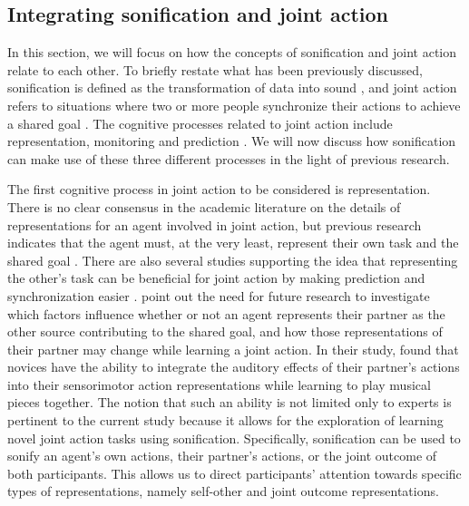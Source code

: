 \documentclass[10pt,a4paper,onecolumn]{article}
\begin{document}
\hypertarget{integrating-sonification-and-joint-action}{%
\subsection{Integrating sonification and joint action}\label{integrating-sonification-and-joint-action}}

In this section, we will focus on how the concepts of sonification and joint action relate to each other. To briefly restate what has been previously discussed, sonification is defined as the transformation of data into sound \autocite{kramerSonificationReportStatus1999}, and joint action refers to situations where two or more people synchronize their actions to achieve a shared goal \autocite{knoblichPsychologicalResearchJoint2011}. The cognitive processes related to joint action include representation, monitoring and prediction \autocite{loehrMonitoringIndividualJoint2013,sebanzJointActionBodies2006,vesperMinimalArchitectureJoint2010}. We will now discuss how sonification can make use of these three different processes in the light of previous research.

The first cognitive process in joint action to be considered is representation. There is no clear consensus in the academic literature on the details of representations for an agent involved in joint action, but previous research indicates that the agent must, at the very least, represent their own task and the shared goal \autocite{vesperMinimalArchitectureJoint2010}. There are also several studies supporting the idea that representing the other's task can be beneficial for joint action by making prediction and synchronization easier \autocite{boltSensoryAttenuationAuditory2021,kellerPianistsDuetBetter2007,kourtisPredictiveRepresentationOther2012,sebanzJointActionBodies2006,wenkeWhatSharedJoint2011}. \textcite{loehrSoundYouMe2016} point out the need for future research to investigate which factors influence whether or not an agent represents their partner as the other source contributing to the shared goal, and how those representations of their partner may change while learning a joint action. In their study, \textcite{loehrSoundYouMe2016} found that novices have the ability to integrate the auditory effects of their partner's actions into their sensorimotor action representations while learning to play musical pieces together. The notion that such an ability is not limited only to experts is pertinent to the current study because it allows for the exploration of learning novel joint action tasks using sonification. Specifically, sonification can be used to sonify an agent's own actions, their partner's actions, or the joint outcome of both participants. This allows us to direct participants' attention towards specific types of representations, namely self-other and joint outcome representations.
\end{document}
